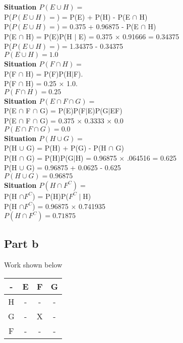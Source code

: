 \documentclass[11pt]{article}
\begin{document}
\noindent
\textbf{Situation $ P(E\cup H)= $ }\\
P($ P(E\cup H)= $) = P(E) + P(H) - P(E $\cap$ H)\\
P($ P(E\cup H)= $) = 0.375 + 0.96875 - P(E $\cap$ H)\\
P(E $\cap$ H) = P(E)P(H $\mid$ E) = 0.375 $\times$ 0.91666 = 0.34375\\
P($ P(E\cup H)= $) = 1.34375 - 0.34375\\
$ P(E\cup H)= 1.0$ \\

\noindent
\textbf{Situation $P(F\cap H)= $ }\\
P(F $\cap$ H) = P(F)P(H$\mid$F). \\
P(F $\cap$ H) = 0.25 $\times$ 1.0. \\
$ P(F\cap H)= 0.25$ \\

\noindent
\textbf{Situation $ P(E\cap F\cap G)= $ }\\
P(E $\cap$ F $\cap$ G) = P(E)P(F$\mid$E)P(G$\mid$EF)\\
P(E $\cap$ F $\cap$ G) = 0.375 $\times$ 0.3333 $\times$ 0.0 \\
$ P(E\cap F\cap G)= 0.0$ \\

\noindent
\textbf{Situation $ P(H\cup G)= $ }\\
P(H $\cup$ G) = P(H) + P(G) - P(H $\cap$ G)\\
P(H $\cap$ G) = P(H)P(G$\mid$H) = 0.96875 $\times$ .064516 = 0.625\\
P(H $\cup$ G) = 0.96875 + 0.0625 - 0.625\\
$ P(H\cup G)= 0.96875 $ \\

\noindent
\textbf{Situation $ P(H\cap F^{C})= $ }\\
P(H $\cap F^{C}$) = P(H)P($F^{C}\mid$H)\\
P(H $\cap F^{C}$) = 0.96875 $\times$ 0.741935\\
$ P(H\cap F^{C})= 0.71875$ \\

\subsection*{Part b}
\noindent *Work shown below
\noindent
\begin{table}[h!]
  \begin{tabular}{||c||c|c|c||}
  	\hline
    - & E & F & G\\
    \hline\hline
    H & - & - & -\\
    \hline
    G & - & X & -\\
    \hline
    F & - & - & -\\
    \hline
  \end{tabular}
\end{table}
\end{document}
